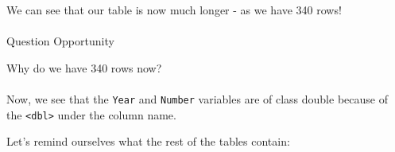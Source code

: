 \documentclass[
]{article}
\begin{document}
We can see that our table is now much longer - as we have 340 rows!

\hypertarget{section-16}{%
\paragraph{}\label{section-16}}

Question Opportunity

Why do we have 340 rows now?

\hypertarget{section-17}{%
\paragraph{}\label{section-17}}

Now, we see that the \texttt{Year} and \texttt{Number} variables are of
class double because of the \texttt{\textless{}dbl\textgreater{}} under
the column name.

Let's remind ourselves what the rest of the tables contain:
\end{document}
